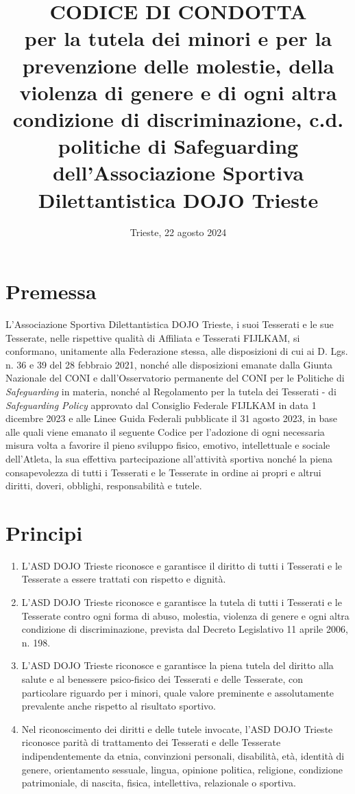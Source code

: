 \documentclass{djtsdoc}
\title{CODICE DI CONDOTTA \\[10pt] {\normalfont\large per la tutela dei minori e per la prevenzione delle molestie, della violenza di genere e di ogni altra condizione di discriminazione, c.d. politiche di Safeguarding
dell'Associazione Sportiva Dilettantistica DOJO Trieste}}
\date{Trieste, 22 agosto 2024}
\begin{document}
		
	\maketitle
	
	\section*{Premessa}
	L'Associazione Sportiva Dilettantistica DOJO Trieste, i suoi Tesserati e le sue Tesserate, nelle rispettive qualità di Affiliata e Tesserati FIJLKAM, si conformano, unitamente alla Federazione stessa, alle disposizioni di cui ai D. Lgs. n. 36 e 39 del 28 febbraio 2021, nonché alle disposizioni emanate dalla Giunta Nazionale del CONI e dall'Osservatorio permanente del CONI per le Politiche di \textit{Safeguarding} in materia, nonché al Regolamento per la tutela dei Tesserati - di \textit{Safeguarding Policy} approvato dal Consiglio Federale FIJLKAM in data 1 dicembre 2023 e alle Linee Guida Federali pubblicate il 31 agosto 2023, in base alle quali viene emanato il seguente Codice per l'adozione di ogni necessaria misura volta a favorire il pieno sviluppo fisico, emotivo, intellettuale e sociale dell'Atleta, la sua effettiva partecipazione all'attività sportiva nonché la piena consapevolezza di tutti i Tesserati e le Tesserate in ordine ai propri e altrui diritti, doveri, obblighi, responsabilità e tutele.
	
	\section{Principi}
	\begin{enumerate}
		\item L'ASD DOJO Trieste riconosce e garantisce il diritto di tutti i Tesserati e le Tesserate a essere trattati con rispetto e dignità.
		\item L'ASD DOJO Trieste riconosce e garantisce la tutela di tutti i Tesserati e le Tesserate contro ogni forma di abuso, molestia, violenza di genere e ogni altra condizione di discriminazione, prevista dal Decreto Legislativo 11 aprile 2006, n. 198.
		\item L'ASD DOJO Trieste riconosce e garantisce la piena tutela del diritto alla salute e al benessere psico-fisico dei Tesserati e delle Tesserate, con particolare riguardo per i minori, quale valore preminente e assolutamente prevalente anche rispetto al risultato sportivo.
		\item Nel riconoscimento dei diritti e delle tutele invocate, l'ASD DOJO Trieste riconosce parità di trattamento dei Tesserati e delle Tesserate indipendentemente da etnia, convinzioni personali, disabilità, età, identità di genere, orientamento sessuale, lingua, opinione politica, religione, condizione patrimoniale, di nascita, fisica, intellettiva, relazionale o sportiva.
	\end{enumerate}
	
\end{document}
